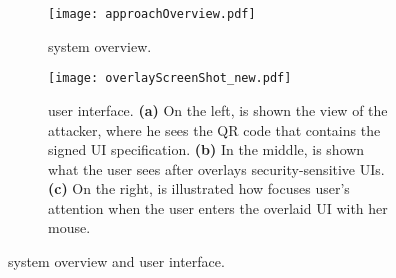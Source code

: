 \begin{figure}[t]
    \begin{center}
        \begin{subfigure}{0.5\textwidth}
        \centering
            \texttt{[image: approachOverview.pdf]}
             \caption{\protection system overview.}
            \label{fig:architecture}    
        \end{subfigure}
    \end{center}
    
    
    \begin{center}
        \begin{subfigure}{0.5\textwidth}
        \centering
       \texttt{[image: overlayScreenShot\_new.pdf]}
    \caption{\protection user interface. \textbf{(a)} On the left, is shown the view of the attacker, where he sees the QR code that contains the signed UI specification. \textbf{(b)} In the middle, is shown what the user sees after \hub overlays security-sensitive UIs. \textbf{(c)} On the right, is illustrated how \protection focuses user's attention when the user enters the overlaid UI with her mouse.}
        \label{fig:screenshot}
    \end{subfigure}
    \end{center}
    
    \caption{\protection system overview and user interface.} 
    \label{fig:protection}
\end{figure}


% 
% 


